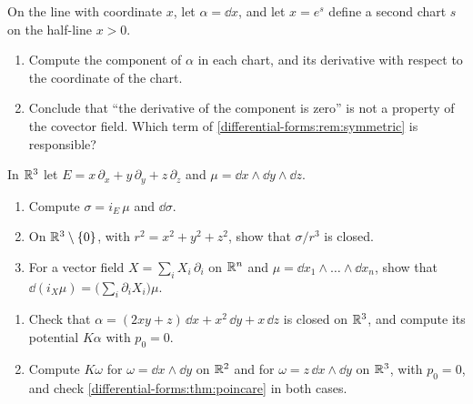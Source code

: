 \begin{notechapter}
\begin{exercise}\label{differential-forms:exr:5}
On the line with coordinate $x$, let $\alpha = \dd x$, and let
$x = e^s$ define a second chart $s$ on the half-line $x > 0$.
\begin{enumerate}[nosep]
  \item Compute the component of $\alpha$ in each chart, and its
        derivative with respect to the coordinate of the chart.
  \item Conclude that ``the derivative of the component is zero'' is
        not a property of the covector field. Which term of
        \cref{differential-forms:rem:symmetric} is responsible?
\end{enumerate}
\end{exercise}

\begin{exercise}\label{differential-forms:exr:6}
In $\mathbb{R}^3$ let $E = x\,\partial_x + y\,\partial_y + z\,\partial_z$ and
$\mu = \dd x\wedge\dd y\wedge\dd z$.
\begin{enumerate}[nosep]
  \item Compute $\sigma = i_E\,\mu$ and $\dd\sigma$.
  \item On $\mathbb{R}^3\setminus\{0\}$, with $r^2 = x^2 + y^2 + z^2$, show
        that $\sigma/r^3$ is closed.
  \item For a vector field $X = \sum_iX_i\,\partial_i$ on $\mathbb{R}^n$ and
        $\mu = \dd x_1\wedge\dots\wedge\dd x_n$, show that
        $\dd(i_X\mu) = \bigl(\sum_i\partial_iX_i\bigr)\mu$.
\end{enumerate}
\end{exercise}

\begin{exercise}\label{differential-forms:exr:7}
\begin{enumerate}[nosep]
  \item Check that
        $\alpha = (2xy + z)\,\dd x + x^2\,\dd y + x\,\dd z$ is closed
        on $\mathbb{R}^3$, and compute its potential $K\alpha$ with
        $p_0 = 0$.
  \item Compute $K\omega$ for $\omega = \dd x\wedge\dd y$ on $\mathbb{R}^2$
        and for $\omega = z\,\dd x\wedge\dd y$ on $\mathbb{R}^3$, with
        $p_0 = 0$, and check
        \cref{differential-forms:thm:poincare} in both cases.
\end{enumerate}
\end{exercise}


\end{notechapter}
